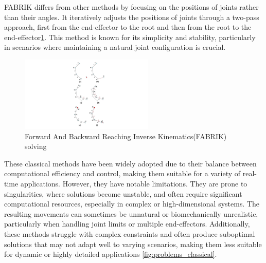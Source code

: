 \documentclass[../../main.tex]{subfiles}
\begin{document}
FABRIK differs from other methods by focusing on the positions of joints rather than their angles. It iteratively adjusts the positions of joints through a two-pass approach, first from the end-effector to the root and then from the root to the end-effector\ref{fig:fabrik}. This method is known for its simplicity and stability, particularly in scenarios where maintaining a natural joint configuration is crucial.

\begin{figure}
  \centering \includegraphics[width = 2.5in]{chapters/motion_matching/images/fabrik.png}
  \caption{Forward And Backward Reaching Inverse Kinematics(FABRIK) solving}
  \label{fig:fabrik}
\end{figure}

These classical methods have been widely adopted due to their balance between computational efficiency and control, making them suitable for a variety of real-time applications. However, they have notable limitations. They are prone to singularities, where solutions become unstable, and often require significant computational resources, especially in complex or high-dimensional systems. The resulting movements can sometimes be unnatural or biomechanically unrealistic, particularly when handling joint limits or multiple end-effectors. Additionally, these methods struggle with complex constraints and often produce suboptimal solutions that may not adapt well to varying scenarios, making them less suitable for dynamic or highly detailed applications \ref{fig:problems_classical}.
\end{document}
